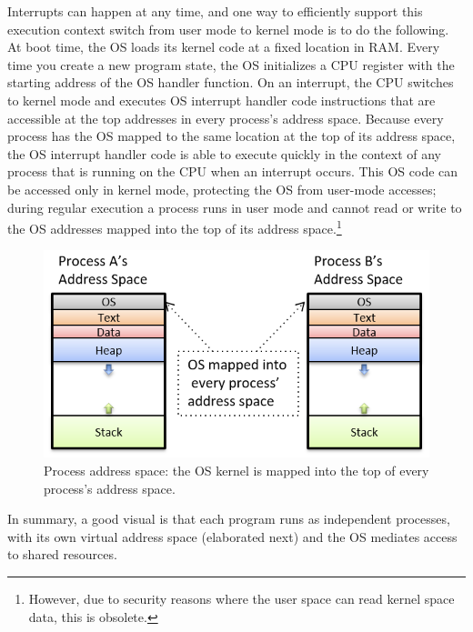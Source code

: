 \documentclass{article}
\begin{document}
    \begin{definition}
      Interrupts can happen at any time, and one way to efficiently support this execution context switch from user mode to kernel mode is to do the following. At boot time, the OS loads its kernel code at a fixed location in RAM. Every time you create a new program state, the OS initializes a CPU register with the starting address of the OS handler function. On an interrupt, the CPU switches to kernel mode and executes OS interrupt handler code instructions that are accessible at the top addresses in every process’s address space. Because every process has the OS mapped to the same location at the top of its address space, the OS interrupt handler code is able to execute quickly in the context of any process that is running on the CPU when an interrupt occurs. This OS code can be accessed only in kernel mode, protecting the OS from user-mode accesses; during regular execution a process runs in user mode and cannot read or write to the OS addresses mapped into the top of its address space.\footnote{However, due to security reasons where the user space can read kernel space data, this is obsolete.}

      \begin{figure}[H]
        \centering 
        \includegraphics[scale=0.4]{img/process_address_space.png}
        \caption{Process address space: the OS kernel is mapped into the top of every process’s address space.} 
        \label{fig:process_address_space}
      \end{figure}
    \end{definition}

    In summary, a good visual is that each program runs as independent processes, with its own virtual address space (elaborated next) and the OS mediates access to shared resources.  
\end{document}
